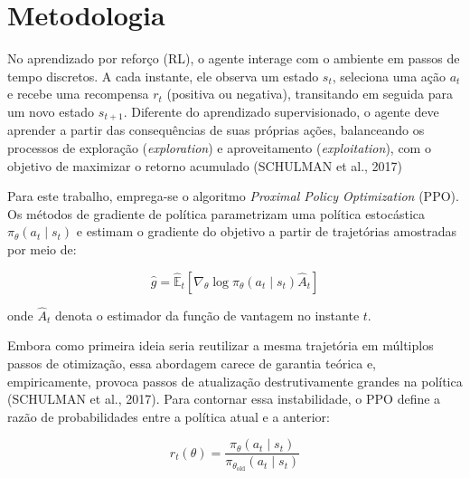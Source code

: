 
\section{Metodologia}

No aprendizado por reforço (RL), o agente interage com o ambiente em passos de tempo discretos. A cada instante, ele observa um estado $s_t$, seleciona uma ação $a_t$ e recebe uma recompensa $r_t$ (positiva ou negativa), transitando em seguida para um novo estado $s_{t+1}$. Diferente do aprendizado supervisionado, o agente deve aprender a partir das consequências de suas próprias ações, balanceando os processos de exploração (\textit{exploration}) e aproveitamento (\textit{exploitation}), com o objetivo de maximizar o retorno acumulado (SCHULMAN et al., 2017)

Para este trabalho, emprega-se o algoritmo \textit{Proximal Policy Optimization} (PPO). Os métodos de gradiente de política parametrizam uma política estocástica $\pi_\theta(a_t \mid s_t)$ e estimam o gradiente do objetivo a partir de trajetórias amostradas por meio de:

\begin{equation}
    \hat{g} = \hat{\mathbb{E}}_t \left[ \nabla_\theta \log \pi_\theta(a_t \mid s_t) \hat{A}_t \right]
    \label{eq:policy_gradient}
\end{equation}

\noindent onde $\hat{A}_t$ denota o estimador da função de vantagem no instante $t$.

Embora como primeira ideia seria reutilizar a mesma trajetória em múltiplos passos de otimização, essa abordagem carece de garantia teórica e, empiricamente, provoca passos de atualização destrutivamente grandes na política (SCHULMAN et al., 2017). Para contornar essa instabilidade, o PPO define a razão de probabilidades entre a política atual e a anterior:

\begin{equation}
    r_t(\theta) = \frac{\pi_\theta(a_t \mid s_t)}{\pi_{\theta_{\text{old}}}(a_t \mid s_t)}
    \label{eq:ratio}
\end{equation}

